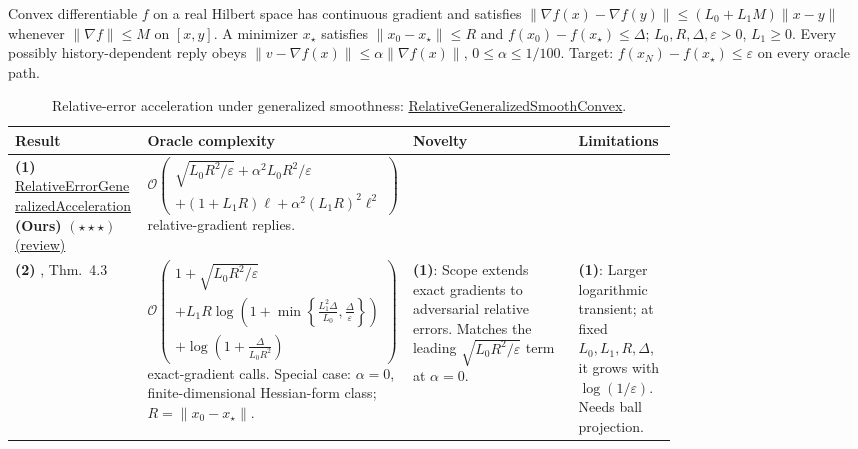 \begin{table}[tp]
\centering
\caption{Relative-error acceleration under generalized smoothness: \href{https://github.com/k3nfalt/longtails/blob/main/LongTails/Setups/RelativeGeneralizedSmoothConvex.lean}{RelativeGeneralizedSmoothConvex}.}\label{tab:RelativeGeneralizedSmoothConvex}
\parbox{\linewidth}{\footnotesize Convex differentiable $f$ on a real Hilbert space has continuous gradient and satisfies $\|\nabla f(x)-\nabla f(y)\|\le (L_0+L_1M)\|x-y\|$ whenever $\|\nabla f\|\le M$ on $[x,y]$. A minimizer $x_\star$ satisfies $\|x_0-x_\star\|\le R$ and $f(x_0)-f(x_\star)\le\Delta$; $L_0,R,\Delta,\varepsilon>0$, $L_1\ge0$. Every possibly history-dependent reply obeys $\|v-\nabla f(x)\|\le\alpha\|\nabla f(x)\|$, $0\le\alpha\le1/100$. Target: $f(x_N)-f(x_\star)\le\varepsilon$ on every oracle path.}\par\smallskip
\begin{threeparttable}
\footnotesize
\setlength{\tabcolsep}{4pt}\renewcommand{\arraystretch}{1.25}
\begin{tabularx}{\linewidth}{@{}>{\raggedright\arraybackslash}p{0.20\linewidth}>{\raggedright\arraybackslash}p{0.32\linewidth}>{\raggedright\arraybackslash}p{0.25\linewidth}>{\raggedright\arraybackslash}X@{}}
\toprule
\textbf{Result} & \textbf{Oracle complexity} & \textbf{Novelty} & \textbf{Limitations} \\
\midrule
\textbf{(1)} \href{https://github.com/k3nfalt/longtails/blob/main/LongTails/Theorems/RelativeErrorGeneralizedAcceleration.lean}{Relative\allowbreak Error\allowbreak Generalized\allowbreak Acceleration} \textbf{(Ours)} $(\star\star\star)$ \href{https://github.com/k3nfalt/longtails/blob/main/scripts/reviews/RelativeErrorGeneralizedAcceleration.md}{(review)} & $\mathcal{O}\!\left(\begin{gathered}\sqrt{L_0R^2/\varepsilon}+\alpha^2L_0R^2/\varepsilon\\ +(1+L_1R)\ell+\alpha^2(L_1R)^2\ell^2\end{gathered}\right)$ relative-gradient replies. & & \\
\midrule[1.2pt]
\textbf{(2)} \citep{cgsTyurin2026v2}, Thm.~4.3 & $\mathcal{O}\!\left(\begin{gathered}1+\sqrt{L_0R^2/\varepsilon}\\ +L_1R\log\!\left(1+\min\!\left\{\frac{L_1^2\Delta}{L_0},\frac{\Delta}{\varepsilon}\right\}\right)\\ +\log\!\left(1+\frac{\Delta}{L_0R^2}\right)\end{gathered}\right)$ exact-gradient calls. Special case: $\alpha=0$, finite-dimensional Hessian-form class; $R=\|x_0-x_\star\|$. & \textbf{(1)}: Scope extends exact gradients to adversarial relative errors. Matches the leading $\sqrt{L_0R^2/\varepsilon}$ term at $\alpha=0$. & \textbf{(1)}: Larger logarithmic transient; at fixed $L_0,L_1,R,\Delta$, it grows with $\log(1/\varepsilon)$. Needs ball projection. \\

\end{tabularx}
\end{threeparttable}
\end{table}
